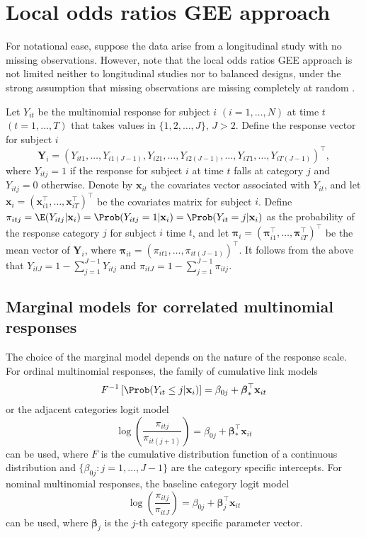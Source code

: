\documentclass[article,shortnames,nojss]{jss}
\begin{document}
\section{Local odds ratios GEE approach} \label{GEENotation}
For notational ease, suppose the data arise from a longitudinal study with no missing observations. However, note that the local odds ratios GEE approach is not limited neither to longitudinal studies nor to balanced designs, under the strong assumption that missing observations are missing completely at random \citep{Rubin1976}.

Let $Y_{it}$ be the multinomial response for subject $i$ $(i=1,\ldots,N)$ at time $t$ $(t=1,\ldots,T)$ that takes values in $\{1,2,\ldots,J\}$, $J>2$. Define the response vector for subject $i$
$$\mathbf {Y}_{i}=(Y_{it1},\ldots,Y_{i1(J-1)},Y_{i21},\ldots,Y_{i2(J-1)},\ldots,Y_{iT1},\ldots,Y_{iT(J-1)})^{\top},$$ 
where $Y_{itj}=1$ if the response for subject $i$ at time $t$ falls at category $j$ and $Y_{itj}=0$ otherwise. Denote by $\mathbf{x}_{it}$ the covariates vector associated with $Y_{it}$, and let $\mathbf x_{i}=(\mathbf x^{\top}_{i1},\ldots,\mathbf x^{\top}_{iT})^{\top}$ be the covariates matrix for subject $i$. Define $\pi_{itj}= \E(Y_{itj}|\mathbf x_i)=\Prob(Y_{itj}=1| \mathbf x_i)=\Prob(Y_{it}=j| \mathbf x_i)$ as the probability of the response category $j$ for subject $i$ time $t$, and let $\boldsymbol \pi_{i}=(\boldsymbol \pi^{\top}_{i1},\ldots,\boldsymbol \pi^{\top}_{iT})^{\top}$ be the mean vector of $\mathbf Y_i$, where $\boldsymbol{\pi}_{it} = (\pi_{it1},\ldots,\pi_{it(J-1)})^{\top}$. It follows from the above that $Y_{itJ}=1-\sum_{j=1}^{J-1} Y_{itj}$ and $\pi_{itJ}=1-\sum_{j=1}^{J-1} \pi_{itj}$.

\subsection{Marginal models for correlated multinomial responses}
The choice of the marginal model depends on the nature of the response scale. For ordinal multinomial responses, the family of cumulative link models
\begin{equation}
F^{-1}\left[\Prob(Y_{it}\leq j|\mathbf x_i)\right]=\beta_{0j}+ {\boldsymbol \beta}_{\ast}^{\top} \mathbf{x}_{it}
\label{ABMCLM}
\end{equation}
or the adjacent categories logit model  
\begin{equation}
\log\left(\frac{\pi_{itj}}{\pi_{it(j+1)}} \right)=\beta_{0j}+ {\boldsymbol \beta}_{\ast}^{\top} \mathbf{x}_{it}
\label{ABMACLM}
\end{equation}
can be used, where $F$ is the cumulative distribution function of a continuous distribution and $\{\beta_{0j}:j=1,\ldots,J-1\}$ are the category specific intercepts. For nominal multinomial responses, the baseline category logit model
\begin{equation}
\log\left(\frac{\pi_{itj}}{\pi_{itJ}}\right)=\beta_{0j}+{\boldsymbol {\beta}}_{j}^{\top} \mathbf{x}_{it}
\label{ABMBCLM}
\end{equation}
can be used, where $\boldsymbol {\beta}_{j}$ is the $j$-th category specific parameter vector.
\end{document}
